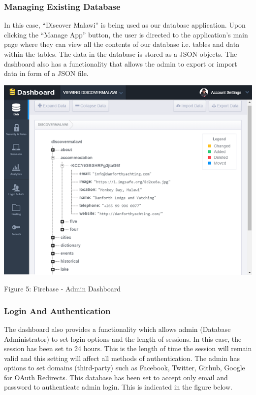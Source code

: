 \subsubsection{Managing Existing Database}
In this case, “Discover Malawi” is being used as our database application. Upon clicking the “Manage App” button, the user is directed to the application’s main page where they can view all the contents of our database i.e. tables and data within the tables. The data in the database is stored as a JSON objects. The dashboard also has a functionality that allows the admin to export or import data in form of a JSON file. 

\begin{center}    
	\includegraphics{img/dashboard.png}
\end{center}
\begin{center}
	Figure 5: Firebase - Admin Dashboard 
\end{center}

\paragraph{}
\subsubsection{Login And Authentication}
The dashboard also provides a functionality which allows admin (Database Administrator) to set login options and the length of sessions. In this case, the session has been set to 24 hours. This is the length of time the session will remain valid and this setting will affect all methods of authentication.
The admin has options to set domains (third-party) such as Facebook, Twitter, Github, Google for OAuth Redirects. This database has been set to accept only email and password to authenticate admin login. This is indicated in the figure below.

